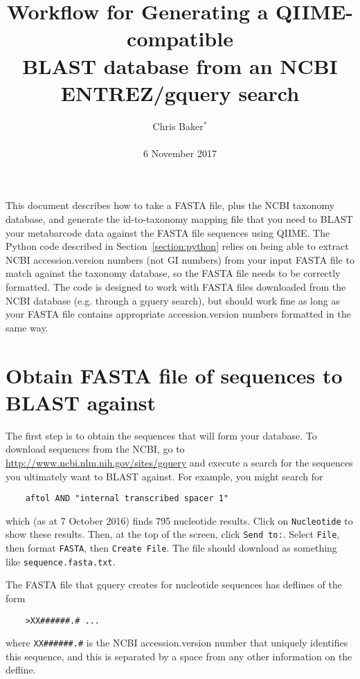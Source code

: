 \documentclass[11pt]{amsart}
\title{Workflow for Generating a QIIME-compatible\\BLAST database from an NCBI ENTREZ/gquery search}
\author{Chris Baker$^*$\\ \\6 November 2017}
\begin{document}
\maketitle

\thispagestyle{fancy}

This document describes how to take a FASTA file, plus the NCBI taxonomy database, and generate the id-to-taxonomy mapping file that you need to BLAST your metabarcode data against the FASTA file sequences using QIIME. The Python code described in Section~\ref{section:python} relies on being able to extract NCBI accession.version numbers (not GI numbers) from your input FASTA file to match against the taxonomy database, so the FASTA file needs to be correctly formatted. The code is designed to work with FASTA files downloaded from the NCBI database (e.g. through a gquery search), but should work fine as long as your FASTA file contains appropriate accession.version numbers formatted in the same way.

\section{Obtain FASTA file of sequences to BLAST against}
\label{section:gquery}

The first step is to obtain the sequences that will form your database. To download sequences from the NCBI, go to \url{http://www.ncbi.nlm.nih.gov/sites/gquery} and execute a search for the sequences you ultimately want to BLAST against. For example, you might search for

\begin{verbatim}
    aftol AND "internal transcribed spacer 1"
\end{verbatim}

which (as at 7 October 2016) finds 795 nucleotide results. Click on \verb|Nucleotide| to show these results. Then, at the top of the screen, click \verb|Send to:|. Select \verb|File|, then format \verb|FASTA|, then \verb|Create File|. The file should download as something like \verb|sequence.fasta.txt|.

The FASTA file that gquery creates for nucleotide sequences has deflines of the form

\begin{verbatim}
    >XX######.# ...
\end{verbatim}

where \verb|XX######.#| is the NCBI accession.version number that uniquely identifies this sequence, and this is separated by a space from any other information on the defline.
\end{document}
